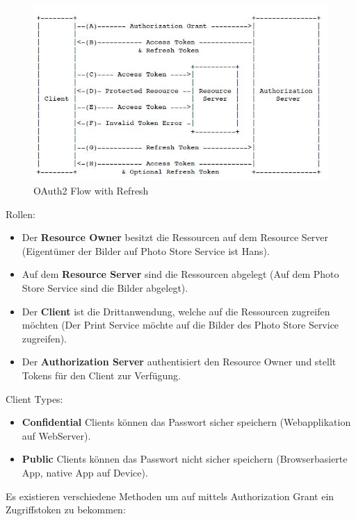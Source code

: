 \begin{figure}[h!]
	\centering
	\includegraphics[width=0.7\linewidth]{fig/oauth2flow-refresh}
	\caption{OAuth2 Flow with Refresh}
	\label{fig:oauth2flow-refresh}
\end{figure}

Rollen:
\begin{itemize}
	\item Der \textbf{Resource Owner} besitzt die Ressourcen auf dem Resource Server (Eigentümer der Bilder auf Photo Store Service ist Hans).
	
	\item Auf dem \textbf{Resource Server} sind die Ressourcen abgelegt (Auf dem Photo Store Service sind die Bilder abgelegt).
	
	\item Der \textbf{Client} ist die Drittanwendung, welche auf die Ressourcen zugreifen möchten (Der Print Service möchte auf die Bilder des Photo Store Service zugreifen).
	
	\item Der \textbf{Authorization Server} authentisiert den Resource Owner und stellt Tokens für den Client zur Verfügung.
\end{itemize}

Client Types:
\begin{itemize}
	\item \textbf{Confidential} Clients können das Passwort sicher speichern (Webapplikation auf WebServer).
	
	\item \textbf{Public} Clients können das Passwort nicht sicher speichern (Browserbasierte App, native App auf Device).
\end{itemize}

Es existieren verschiedene Methoden um auf mittels Authorization Grant ein Zugriffstoken zu bekommen:

